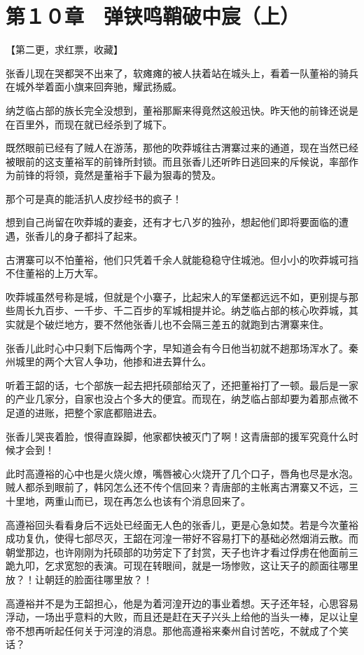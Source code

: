 \section{第１０章　弹铗鸣鞘破中宸（上）}

【第二更，求红票，收藏】

张香儿现在哭都哭不出来了，软瘫瘫的被人扶着站在城头上，看着一队董裕的骑兵在城外举着面小旗来回奔驰，耀武扬威。

纳芝临占部的族长完全没想到，董裕那厮来得竟然这般迅快。昨天他的前锋还说是在百里外，而现在就已经杀到了城下。

既然眼前已经有了贼人在游荡，那他的吹莽城往古渭寨过来的通道，现在当然已经被眼前的这支董裕军的前锋所封锁。而且张香儿还听昨日逃回来的斥候说，率部作为前锋的将领，竟然是董裕手下最为狠毒的赞及。

那个可是真的能活扒人皮抄经书的疯子！

想到自己尚留在吹莽城的妻妾，还有才七八岁的独孙，想起他们即将要面临的遭遇，张香儿的身子都抖了起来。

古渭寨可以不怕董裕，他们只凭着千余人就能稳稳守住城池。但小小的吹莽城可挡不住董裕的上万大军。

吹莽城虽然号称是城，但就是个小寨子，比起宋人的军堡都远远不如，更别提与那些周长九百步、一千步、千二百步的军城相提并论。纳芝临占部的核心吹莽城，其实就是个破烂地方，要不然他张香儿也不会隔三差五的就跑到古渭寨来住。

张香儿此时心中只剩下后悔两个字，早知道会有今日他当初就不趟那场浑水了。秦州城里的两个大官人争功，他掺和进去算什么。

听着王韶的话，七个部族一起去把托硕部给灭了，还把董裕打了一顿。最后是一家的产业几家分，自家也没占个多大的便宜。而现在，纳芝临占部却要为着那点微不足道的进账，把整个家底都赔进去。

张香儿哭丧着脸，恨得直跺脚，他家都快被灭门了啊！这青唐部的援军究竟什么时候才会到！

此时高遵裕的心中也是火烧火燎，嘴唇被心火烧开了几个口子，唇角也尽是水泡。贼人都杀到眼前了，韩冈怎么还不传个信回来？青唐部的主帐离古渭寨又不远，三十里地，两重山而已，现在再怎么也该有个消息回来了。

高遵裕回头看看身后不远处已经面无人色的张香儿，更是心急如焚。若是今次董裕成功复仇，使得七部尽灭，王韶在河湟一带好不容易打下的基础必然烟消云散。而朝堂那边，也许刚刚为托硕部的功劳定下了封赏，天子也许才看过俘虏在他面前三跪九叩，乞求宽恕的表演。可现在转眼间，就是一场惨败，这让天子的颜面往哪里放？！让朝廷的脸面往哪里放？！

高遵裕并不是为王韶担心，他是为着河湟开边的事业着想。天子还年轻，心思容易浮动，一场出乎意料的大败，而且还是赶在天子兴头上给他的当头一棒，足以让皇帝不想再听起任何关于河湟的消息。那他高遵裕来秦州自讨苦吃，不就成了个笑话？

